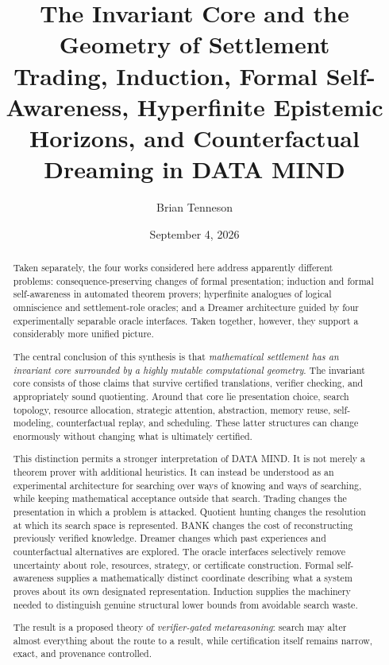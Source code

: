 \documentclass[11pt]{article}
\title{\textbf{The Invariant Core and the Geometry of Settlement}\\[0.5em]
\large Trading, Induction, Formal Self-Awareness, Hyperfinite Epistemic Horizons, and Counterfactual Dreaming in DATA MIND}
\author{Brian Tenneson}
\date{September 4, 2026}
\begin{document}
\maketitle

\begin{abstract}
Taken separately, the four works considered here address apparently different problems: consequence-preserving changes of formal presentation; induction and formal self-awareness in automated theorem provers; hyperfinite analogues of logical omniscience and settlement-role oracles; and a Dreamer architecture guided by four experimentally separable oracle interfaces. Taken together, however, they support a considerably more unified picture.

The central conclusion of this synthesis is that \emph{mathematical settlement has an invariant core surrounded by a highly mutable computational geometry}. The invariant core consists of those claims that survive certified translations, verifier checking, and appropriately sound quotienting. Around that core lie presentation choice, search topology, resource allocation, strategic attention, abstraction, memory reuse, self-modeling, counterfactual replay, and scheduling. These latter structures can change enormously without changing what is ultimately certified.

This distinction permits a stronger interpretation of DATA MIND. It is not merely a theorem prover with additional heuristics. It can instead be understood as an experimental architecture for searching over ways of knowing and ways of searching, while keeping mathematical acceptance outside that search. Trading changes the presentation in which a problem is attacked. Quotient hunting changes the resolution at which its search space is represented. BANK changes the cost of reconstructing previously verified knowledge. Dreamer changes which past experiences and counterfactual alternatives are explored. The oracle interfaces selectively remove uncertainty about role, resources, strategy, or certificate construction. Formal self-awareness supplies a mathematically distinct coordinate describing what a system proves about its own designated representation. Induction supplies the machinery needed to distinguish genuine structural lower bounds from avoidable search waste.

The result is a proposed theory of \emph{verifier-gated metareasoning}: search may alter almost everything about the route to a result, while certification itself remains narrow, exact, and provenance controlled.
\end{abstract}
\end{document}
